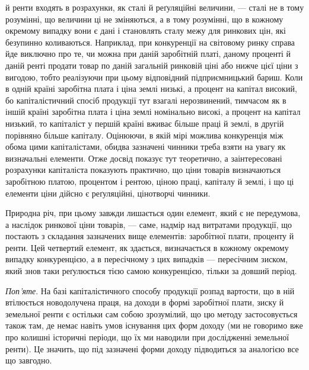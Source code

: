 \parcont{} %
й ренти входять в розрахунки, як сталі й реґуляційні величини, — сталі не в тому
розумінні, що величини ці не зміняються, а в тому розумінні, що в кожному окремому
випадку вони є дані і становлять сталу межу для ринкових цін, які безупинно
коливаються. Наприклад, при конкуренції на світовому ринку справа
йде виключно про те, чи можна при даній заробітній платі, даному проценті й
даній ренті продати товар по даній загальній ринковій ціні або нижче цієї ціни
з вигодою, тобто реалізуючи при цьому відповідний підприємницький бариш.
Коли в одній країні заробітна плата і ціна землі низькі, а процент на капітал
високий, бо капіталістичний спосіб продукції тут взагалі нерозвинений,
тимчасом як в іншій країні заробітна плата і ціна землі номінально високі, а
процент на капітал низький, то капіталіст у першій країні вживає більше праці
й землі, в другій порівняно більше капіталу. Оцінюючи, в якій мірі можлива
конкуренція між обома цими капіталістами, обидва зазначені чинники треба
взяти на увагу як визначальні елементи. Отже досвід показує тут теоретично, а
заінтересовані розрахунки капіталіста показують практично, що ціни товарів
визначаються заробітною платою, процентом і рентою, ціною праці, капіталу
й землі, і що ці елементи ціни дійсно є реґуляційні, цінотворчі чинники.

Природна річ, при цьому завжди лишається один елемент, який є не
передумова, а наслідок ринкової ціни товарів, — саме, надмір над витратами продукції, що постають з
складання зазначених вище елементів: заробітної плати,
проценту й ренти. Цей четвертий елемент, як здається, визначається в кожному
окремому випадку конкуренцією, а в пересічному з цих випадків — пересічним
зиском, який знов таки реґулюється тією самою конкуренцією, тільки за довший
період.

\emph{Поп’яте}. На базі капіталістичного способу продукції розпад вартости, що
в ній втілюється новодолучена праця, на доходи в формі заробітної плати, зиску
й земельної ренти є остільки сам собою зрозумілий, що цю методу застосовується
також там, де немає навіть умов існування цих форм доходу (ми не говоримо
вже про колишні історичні періоди, що їх ми наводили при дослідженні
земельної ренти). Це значить, що під зазначені форми доходу підводиться за
аналогією все що завгодно.

